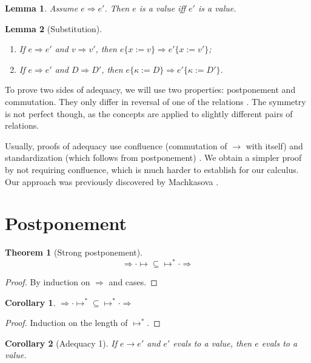 \documentclass[a4paper, 11pt,titlepage, openright, twoside]{report}
\newcommand{\Int}{\Rightarrow}
\newcommand{\subst}[2]{\{#1{:=}#2\}}
\newcommand{\+}{\enspace}
\newtheorem{corollary}{Corollary}
\newtheorem{lemma}{Lemma}
\newtheorem{theorem}{Theorem}
\begin{document}
\begin{lemma} Assume $e \Int e'$. Then $e$ is a value iff $e'$ is a value.
\end{lemma}

\begin{lemma}[Substitution]
	\item
	\begin{enumerate}
		\item If $e \Int e'$ and $v \Int v'$, then $e\subst{x}{v} \Int e'\subst{x}{v'}$;
		\item If $e \Int e'$ and $D \Int D'$, then $e\subst{κ}{D} \Int e'\subst{κ}{D'}$.
	\end{enumerate}
\end{lemma}

To prove two sides of adequacy, we will use two properties: postponement and commutation.
They only differ in reversal of one of the relations \cite{factorize}.
The symmetry is not perfect though, as the concepts are applied to slightly different pairs of relations.

Usually, proofs of adequacy use confluence (commutation of $→$ with itself) and standardization (which follows from postponement) \cite{Plotkin75, crary2009}.
We obtain a simpler proof by not requiring confluence, which is much harder to establish for our calculus.
Our approach was previously discovered by Machkasova \cite{machka}.

\section{Postponement}

\begin{theorem}[Strong postponement]
	$${\Int · ↦} ⊆ {↦^* · \Int}$$
\end{theorem}
\begin{proof}
	By induction on $\Int$ and cases.
\end{proof}
\begin{corollary}
	${\Int · ↦^*} ⊆ {↦^* · \Int}$
\end{corollary}
\begin{proof}
	Induction on the length of $↦^*$.
\end{proof}
\begin{corollary}[Adequacy 1]
	If $e → e'$ and $e'$ evals to a value, then $e$ evals to a value.
\end{corollary}
\end{document}

